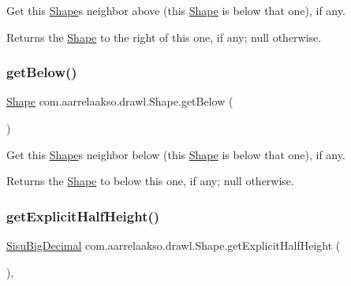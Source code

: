 Get this \hyperlink{classcom_1_1aarrelaakso_1_1drawl_1_1_shape}{Shape}\textquotesingle{}s neighbor above (this \hyperlink{classcom_1_1aarrelaakso_1_1drawl_1_1_shape}{Shape} is below that one), if any. 

\begin{DoxyReturn}{Returns}
the \hyperlink{classcom_1_1aarrelaakso_1_1drawl_1_1_shape}{Shape} to the right of this one, if any; {\ttfamily null} otherwise. 
\end{DoxyReturn}
\mbox{\label{classcom_1_1aarrelaakso_1_1drawl_1_1_shape_a53de5ab609d879719cd3b372dfe8df58}} 
\subsubsection{\texorpdfstring{get\+Below()}{getBelow()}}
{\footnotesize\ttfamily \hyperlink{classcom_1_1aarrelaakso_1_1drawl_1_1_shape}{Shape} com.\+aarrelaakso.\+drawl.\+Shape.\+get\+Below (\begin{DoxyParamCaption}{ }\end{DoxyParamCaption})\hspace{0.3cm}{\ttfamily [inherited]}}



Get this \hyperlink{classcom_1_1aarrelaakso_1_1drawl_1_1_shape}{Shape}\textquotesingle{}s neighbor below (this \hyperlink{classcom_1_1aarrelaakso_1_1drawl_1_1_shape}{Shape} is below that one), if any. 

\begin{DoxyReturn}{Returns}
the \hyperlink{classcom_1_1aarrelaakso_1_1drawl_1_1_shape}{Shape} to below this one, if any; {\ttfamily null} otherwise. 
\end{DoxyReturn}
\mbox{\label{classcom_1_1aarrelaakso_1_1drawl_1_1_shape_aa3857406bc4f6c7373f1cd7cbe16dfd9}} 
\subsubsection{\texorpdfstring{get\+Explicit\+Half\+Height()}{getExplicitHalfHeight()}}
{\footnotesize\ttfamily \hyperlink{classcom_1_1aarrelaakso_1_1drawl_1_1_sisu_big_decimal}{Sisu\+Big\+Decimal} com.\+aarrelaakso.\+drawl.\+Shape.\+get\+Explicit\+Half\+Height (\begin{DoxyParamCaption}{ }\end{DoxyParamCaption})\hspace{0.3cm}{\ttfamily [protected]}, {\ttfamily [inherited]}}


